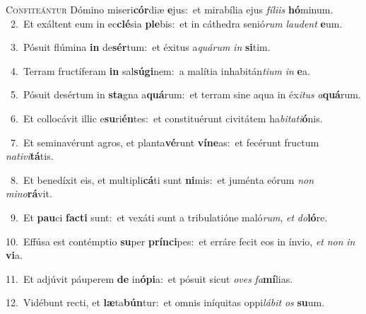 \lettrine{\initial\textcolor{\initialcolor}{C}}{onfiteántur} Dómino miseri\-\textbf{cór}\-diæ \textbf{e}\-jus:~\star et mirabília ejus \textit{fí}\-\textit{li}\textit{is} \textbf{hó}\-minum.\\
{\numbfont\textcolor{\numbcolor}{~2.}}~Et exáltent eum in ec\-\textbf{clé}\-sia \textbf{ple}\-bis:~\star et in cáthedra senió\textit{rum} \textit{lau}\-\textit{dent} \textbf{e}\-um.\par
{\numbfont\textcolor{\numbcolor}{~3.}}~Pósuit flúmina \textbf{in} de\-\textbf{sér}\-tum:~\star et éxitus a\-\textit{quá}\-\textit{rum} \textit{in} \textbf{si}\-tim.\par
{\numbfont\textcolor{\numbcolor}{~4.}}~Terram fructíferam \textbf{in} sal\-\textbf{sú}\-\textbf{gi}nem:~\star a malítia inhabitán\-\textit{ti}\-\textit{um} \textit{in} \textbf{e}\-a.\par
{\numbfont\textcolor{\numbcolor}{~5.}}~Pósuit desértum in \textbf{sta}\-gna a\-\textbf{quá}\-rum:~\star et terram sine aqua in éx\-\textit{i}\-\textit{tus} \textit{a}\-\textbf{quá}rum.\par
{\numbfont\textcolor{\numbcolor}{~6.}}~Et collocávit illic e\-\textbf{su}\-ri\-\textbf{én}\-tes:~\star et constituérunt civitátem ha\-\textit{bi}\-\textit{ta}\textit{ti}\textbf{ó}nis.\par
{\numbfont\textcolor{\numbcolor}{~7.}}~Et seminavérunt agros, et planta\-\textbf{vé}\-runt \textbf{ví}\-\textbf{ne}as:~\star et fecérunt fructum \textit{na}\-\textit{ti}\textit{vi}\textbf{tá}tis.\par
{\numbfont\textcolor{\numbcolor}{~8.}}~Et benedíxit eis, et multipli\-\textbf{cá}\-ti sunt \textbf{ni}\-mis:~\star et juménta eórum \textit{non} \textit{mi}\-\textit{no}\textbf{rá}vit.\par
{\numbfont\textcolor{\numbcolor}{~9.}}~Et \textbf{pau}\-ci \textbf{fac}\-\textbf{ti} sunt:~\star et vexáti sunt a tribulatióne maló\-\textit{rum}\-, \textit{et} \textit{do}\-\textbf{ló}re.\par
{\numbfont\textcolor{\numbcolor}{10.}}~Effúsa est contémptio \textbf{su}\-per \textbf{prín}\-\textbf{ci}pes:~\star et erráre fecit eos in ínvio, \textit{et} \textit{non} \textit{in} \textbf{vi}\-a.\par
{\numbfont\textcolor{\numbcolor}{11.}}~Et adjúvit páuperem \textbf{de} in\-\textbf{ó}\-\textbf{pi}a:~\star et pósuit sicut \textit{o}\-\textit{ves} \textit{fa}\-\textbf{mí}lias.\par
{\numbfont\textcolor{\numbcolor}{12.}}~Vidébunt recti, et \textbf{læ}\-ta\-\textbf{bún}\-tur:~\star et omnis iníquitas oppi\-\textit{lá}\-\textit{bit} \textit{os} \textbf{su}\-um.\par
